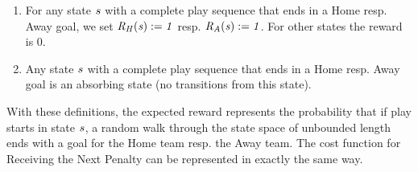 \documentclass[]{article}
\begin{document}
\begin{enumerate}
\item For any state $s$ with a complete play sequence that ends in a Home resp. Away goal, we set $\it{R}_{H}(s) := 1$ resp. $\it{R}_{A}(s) := 1$. For other states the reward is 0.
\item Any state $s$ with a complete play sequence that ends in a Home resp. Away goal is an absorbing state (no transitions from this state).
\end{enumerate}
%


With these definitions, the expected reward %
%
represents the probability that if play starts in state $s$, a random walk through the state space of unbounded length ends with a goal for the Home team resp. the Away team. The cost function for Receiving the Next Penalty can be represented in exactly the same way.
%
\end{document}
